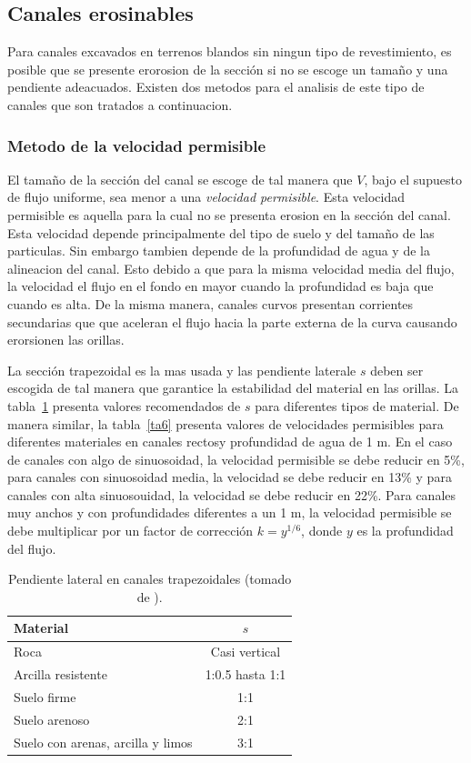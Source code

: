 \documentclass[11pt, oneside]{article}
\begin{document}
\subsection{Canales erosinables}
Para canales excavados en terrenos blandos sin ningun tipo de revestimiento, es posible que se presente erorosion de la secci\'on si no se escoge un tamaño y una pendiente adeacuados. Existen dos metodos para el analisis de este tipo de canales que son tratados a continuacion.

\subsubsection{Metodo de la velocidad permisible}
El tamaño de la secci\'on del canal se escoge de tal manera que $V$, bajo el supuesto de flujo uniforme, sea menor a una \emph{velocidad permisible}. Esta velocidad permisible es aquella para la cual no se presenta erosion en la secci\'on del canal. Esta velocidad depende principalmente del tipo de suelo y del tamaño de las particulas. Sin embargo tambien depende de la profundidad de agua y de la alineacion del canal. Esto debido a que para la misma velocidad media del flujo, la velocidad el flujo en el fondo en mayor cuando la profundidad es baja que cuando es alta. De la misma manera, canales curvos presentan corrientes secundarias que que aceleran el flujo hacia la parte externa de la curva causando erorsionen las orillas. 

La secci\'on trapezoidal es la mas usada y las pendiente laterale $s$ deben ser escogida de tal manera que garantice la estabilidad del material en las orillas. La tabla~\ref{ta5} presenta valores recomendados de $s$ para diferentes tipos de material. De manera similar, la tabla~\ref{ta6} presenta valores de velocidades permisibles para diferentes materiales en canales rectosy profundidad de agua de 1 m. En el caso de canales con algo de sinuosoidad, la velocidad permisible se debe reducir en 5\%, para canales con sinuosoidad media, la velocidad se debe reducir en 13\% y para canales con alta sinuosouidad, la velocidad se debe reducir en 22\%. Para canales muy anchos y con profundidades diferentes a un 1 m, la velocidad permisible se debe multiplicar por un factor de correcci\'on $k=y^{1/6}$, donde $y$ es la profundidad del flujo. 

\begin{table}[h!]
\centering
\begin{tabular}{l c}
 \hline
  Material & $s$ \\ [0.5ex]
 \hline\hline
 Roca & Casi vertical \\
 Arcilla resistente & 1:0.5 hasta 1:1 \\
 Suelo firme & 1:1 \\
 Suelo arenoso & 2:1 \\
 Suelo con arenas, arcilla y limos & 3:1 \\
\hline
\end{tabular}
\caption{Pendiente lateral en canales trapezoidales (tomado de \cite{Chau}).}
\label{ta5}
\end{table}
\end{document}
